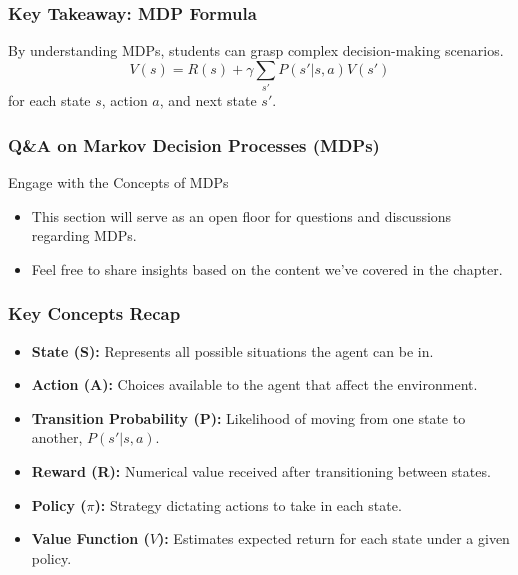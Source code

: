 \documentclass[aspectratio=169]{beamer}
\begin{document}
\begin{frame}[fragile]
    \frametitle{Key Takeaway: MDP Formula}
    By understanding MDPs, students can grasp complex decision-making scenarios.
    \begin{equation}
        V(s) = R(s) + \gamma \sum_{s'} P(s' | s, a) V(s')
    \end{equation}
    for each state \(s\), action \(a\), and next state \(s'\).
\end{frame}

\begin{frame}[fragile]
    \frametitle{Q\&A on Markov Decision Processes (MDPs)}
    \begin{block}{Engage with the Concepts of MDPs}
        \begin{itemize}
            \item This section will serve as an open floor for questions and discussions regarding MDPs.
            \item Feel free to share insights based on the content we've covered in the chapter.
        \end{itemize}
    \end{block}
\end{frame}

\begin{frame}[fragile]
    \frametitle{Key Concepts Recap}
    \begin{itemize}
        \item \textbf{State (S):} Represents all possible situations the agent can be in.
        \item \textbf{Action (A):} Choices available to the agent that affect the environment.
        \item \textbf{Transition Probability (P):} Likelihood of moving from one state to another, $P(s' | s, a)$.
        \item \textbf{Reward (R):} Numerical value received after transitioning between states.
        \item \textbf{Policy ($\pi$):} Strategy dictating actions to take in each state.
        \item \textbf{Value Function ($V$):} Estimates expected return for each state under a given policy.
    \end{itemize}
\end{frame}
\end{document}
